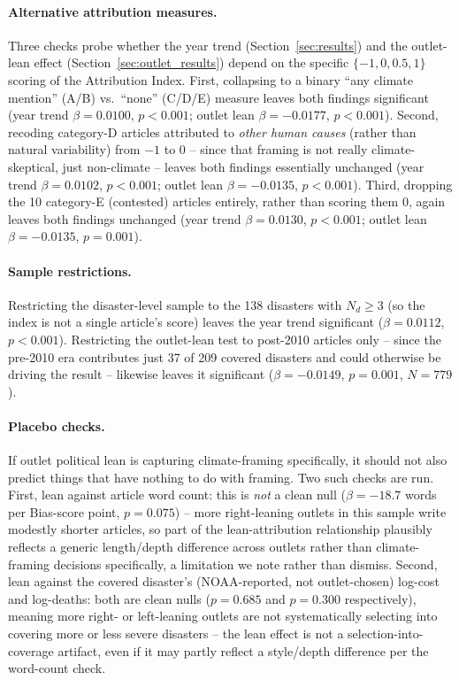\documentclass[12pt]{article}
\begin{document}
\paragraph{Alternative attribution measures.} Three checks probe whether
the year trend (Section~\ref{sec:results}) and the outlet-lean effect
(Section~\ref{sec:outlet_results}) depend on the specific
$\{-1,0,0.5,1\}$ scoring of the Attribution Index. First, collapsing to a
binary ``any climate mention'' (A/B) vs.\ ``none'' (C/D/E) measure leaves
both findings significant (year trend $\beta=0.0100$, $p<0.001$; outlet
lean $\beta=-0.0177$, $p<0.001$). Second, recoding category-D articles
attributed to \emph{other human causes} (rather than natural variability)
from $-1$ to $0$ -- since that framing is not really climate-skeptical,
just non-climate -- leaves both findings essentially unchanged (year trend
$\beta=0.0102$, $p<0.001$; outlet lean $\beta=-0.0135$, $p<0.001$). Third,
dropping the 10 category-E (contested) articles entirely, rather than
scoring them $0$, again leaves both findings unchanged (year trend
$\beta=0.0130$, $p<0.001$; outlet lean $\beta=-0.0135$, $p=0.001$).

\paragraph{Sample restrictions.} Restricting the disaster-level sample to
the 138 disasters with $N_d \geq 3$ (so the index is not a single
article's score) leaves the year trend significant
($\beta=0.0112$, $p<0.001$). Restricting the outlet-lean test to
post-2010 articles only -- since the pre-2010 era contributes just 37 of
209 covered disasters and could otherwise be driving the result --
likewise leaves it significant ($\beta=-0.0149$, $p=0.001$, $N=779$).

\paragraph{Placebo checks.} If outlet political lean is capturing
climate-framing specifically, it should not also predict things that have
nothing to do with framing. Two such checks are run. First, lean against
article word count: this is \emph{not} a clean null
($\beta=-18.7$ words per Bias-score point, $p=0.075$) -- more
right-leaning outlets in this sample write modestly shorter articles, so
part of the lean-attribution relationship plausibly reflects a generic
length/depth difference across outlets rather than climate-framing
decisions specifically, a limitation we note rather than dismiss. Second,
lean against the covered disaster's (NOAA-reported, not outlet-chosen)
log-cost and log-deaths: both are clean nulls ($p=0.685$ and $p=0.300$
respectively), meaning more right- or left-leaning outlets are not
systematically selecting into covering more or less severe disasters --
the lean effect is not a selection-into-coverage artifact, even if it may
partly reflect a style/depth difference per the word-count check.
\end{document}
